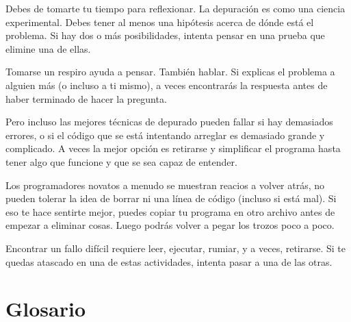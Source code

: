 
Debes de tomarte tu tiempo para reflexionar. La depuración es como una
ciencia experimental. Debes tener al menos una hipótesis acerca
de dónde está el problema. Si hay dos o más posibilidades, intenta
pensar en una prueba que elimine una de ellas.

Tomarse un respiro ayuda a pensar. También hablar.
Si explicas el problema a alguien más (o incluso a ti mismo),
a veces encontrarás la respuesta antes de haber terminado de hacer la pregunta.

Pero incluso las mejores técnicas de depurado pueden fallar si hay demasiados
errores, o si el código que se está intentando arreglar es demasiado grande
y complicado. A veces la mejor opción es retirarse y simplificar el
programa hasta tener algo que funcione y que se sea
capaz de entender.

Los programadores novatos a menudo se muestran reacios a volver atrás,
no pueden tolerar la idea de borrar ni una línea de código (incluso si está mal).
Si eso te hace sentirte mejor, puedes copiar tu programa en otro archivo
antes de empezar a eliminar cosas. Luego podrás volver a pegar los
trozos poco a poco.

Encontrar un fallo difícil requiere leer, ejecutar, rumiar, y
a veces, retirarse. Si te quedas atascado en una de estas actividades,
intenta pasar a una de las otras.


\section{Glosario}

